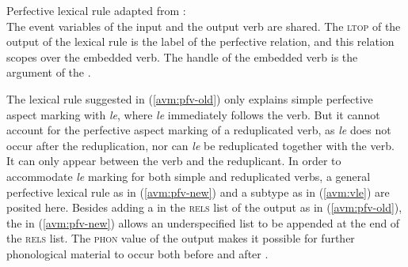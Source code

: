 \ea\label{avm:pfv-old}
Perfective lexical rule adapted from \citet[246]{MuellerLipenkova2013}:\\
\z
The event variables  of the input and the output verb are shared. 
The \textsc{ltop} of the output of the lexical rule  is the label of the perfective relation, 
and this relation scopes over the embedded verb. 
The handle of the embedded verb  is the argument of the . 

The lexical rule suggested in (\ref{avm:pfv-old}) only explains simple perfective aspect marking with \textit{le}, 
where \textit{le} immediately follows the verb.
But it cannot account for the perfective aspect marking of a reduplicated verb,
 as \textit{le} does not occur after the reduplication, 
nor can \textit{le} be reduplicated together with the verb.
It can only appear between the verb and the reduplicant.
In order to accommodate \textit{le} marking for both simple and reduplicated verbs, 
a general perfective lexical rule as in (\ref{avm:pfv-new}) and 
a subtype  as in (\ref{avm:vle}) are posited here.
Besides adding a  in the \textsc{rels} list of the output as in (\ref{avm:pfv-old}), 
the  in (\ref{avm:pfv-new}) allows an underspecified list to be appended at the end of the \textsc{rels} list.
The \textsc{phon} value of the output makes it possible for further phonological material to occur both before and after .

